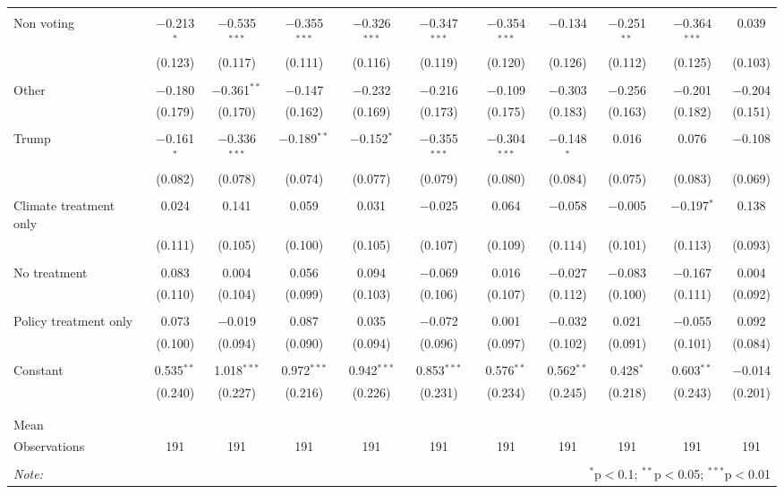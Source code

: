 \begin{tabular}{@{\extracolsep{5pt}}lcccccccccc}
  & & & & & & & & & & \\ 
 Non voting & $-$0.213$^{*}$ & $-$0.535$^{***}$ & $-$0.355$^{***}$ & $-$0.326$^{***}$ & $-$0.347$^{***}$ & $-$0.354$^{***}$ & $-$0.134 & $-$0.251$^{**}$ & $-$0.364$^{***}$ & 0.039 \\ 
  & (0.123) & (0.117) & (0.111) & (0.116) & (0.119) & (0.120) & (0.126) & (0.112) & (0.125) & (0.103) \\ 
  & & & & & & & & & & \\ 
 Other & $-$0.180 & $-$0.361$^{**}$ & $-$0.147 & $-$0.232 & $-$0.216 & $-$0.109 & $-$0.303 & $-$0.256 & $-$0.201 & $-$0.204 \\ 
  & (0.179) & (0.170) & (0.162) & (0.169) & (0.173) & (0.175) & (0.183) & (0.163) & (0.182) & (0.151) \\ 
  & & & & & & & & & & \\ 
 Trump & $-$0.161$^{*}$ & $-$0.336$^{***}$ & $-$0.189$^{**}$ & $-$0.152$^{*}$ & $-$0.355$^{***}$ & $-$0.304$^{***}$ & $-$0.148$^{*}$ & 0.016 & 0.076 & $-$0.108 \\ 
  & (0.082) & (0.078) & (0.074) & (0.077) & (0.079) & (0.080) & (0.084) & (0.075) & (0.083) & (0.069) \\ 
  & & & & & & & & & & \\ 
 Climate treatment only & 0.024 & 0.141 & 0.059 & 0.031 & $-$0.025 & 0.064 & $-$0.058 & $-$0.005 & $-$0.197$^{*}$ & 0.138 \\ 
  & (0.111) & (0.105) & (0.100) & (0.105) & (0.107) & (0.109) & (0.114) & (0.101) & (0.113) & (0.093) \\ 
  & & & & & & & & & & \\ 
 No treatment & 0.083 & 0.004 & 0.056 & 0.094 & $-$0.069 & 0.016 & $-$0.027 & $-$0.083 & $-$0.167 & 0.004 \\ 
  & (0.110) & (0.104) & (0.099) & (0.103) & (0.106) & (0.107) & (0.112) & (0.100) & (0.111) & (0.092) \\ 
  & & & & & & & & & & \\ 
 Policy treatment only & 0.073 & $-$0.019 & 0.087 & 0.035 & $-$0.072 & 0.001 & $-$0.032 & 0.021 & $-$0.055 & 0.092 \\ 
  & (0.100) & (0.094) & (0.090) & (0.094) & (0.096) & (0.097) & (0.102) & (0.091) & (0.101) & (0.084) \\ 
  & & & & & & & & & & \\ 
 Constant & 0.535$^{**}$ & 1.018$^{***}$ & 0.972$^{***}$ & 0.942$^{***}$ & 0.853$^{***}$ & 0.576$^{**}$ & 0.562$^{**}$ & 0.428$^{*}$ & 0.603$^{**}$ & $-$0.014 \\ 
  & (0.240) & (0.227) & (0.216) & (0.226) & (0.231) & (0.234) & (0.245) & (0.218) & (0.243) & (0.201) \\ 
  & & & & & & & & & & \\ 
\hline \\[-1.8ex] 
Mean &  &  &  &  &  &  &  &  &  &  \\ 
Observations & 191 & 191 & 191 & 191 & 191 & 191 & 191 & 191 & 191 & 191 \\ 
\hline 
\hline \\[-1.8ex] 
\textit{Note:}  & \multicolumn{10}{r}{$^{*}$p$<$0.1; $^{**}$p$<$0.05; $^{***}$p$<$0.01} \\ 
\end{tabular} 
